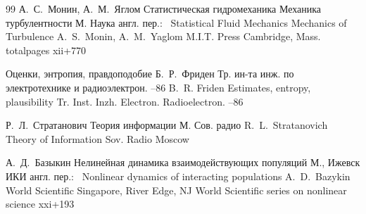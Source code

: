 \begin{thebibliography}{99}
\by А.~С.~Монин, А.~М.~Яглом 
\book Статистическая гидромеханика
\volinfo Механика турбулентности
\publaddr М. 
\publ Наука 
\transl
англ. пер.:~
\book Statistical Fluid Mechanics
\volinfo Mechanics of Turbulence
\by A.~S.~Monin, A.~M.~Yaglom
\publ  M.I.T. Press
\publaddr Cambridge, Mass.
totalpages xii+770 

\paper Оценки, энтропия, правдоподобие 
\by Б.~Р.~Фриден 
\jour Тр. ин-та инж. по электротехнике и радиоэлектрон.
--86
\misctransl 
\by B.~R. Friden
\paper Estimates, entropy, plausibility
\jour Tr. Inst. Inzh. Electron. Radioelectron.
--86 


\by Р.~Л.~Стратанович 
\book Теория информации 
\publaddr М. 
\publ Сов. радио 
\by R.~L.~Stratanovich
\book Theory of Information 
\publ Sov. Radio
\publaddr Moscow

\by А.~Д.~Базыкин 
\book Нелинейная динамика взаимодействующих популяций 
\publaddr  М., Ижевск 
\publ ИКИ 
\transl англ. пер.:~
\book Nonlinear dynamics of interacting populations
\by A.~D.~Bazykin 
\publ World Scientific 
\publaddr Singapore, River Edge, NJ 
\serial World Scientific series on nonlinear science
\totalpages xxi+193 

\end{thebibliography}


\noindent
\hskip6.5cm \thedate \par\noindent
\hskip6.5cm\therevdate
%


%
%

\makeengtitle



 \newpage
%
%
%
